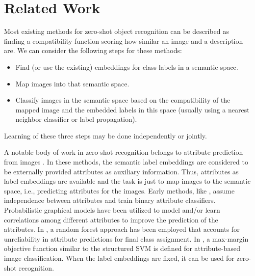 \documentclass[10pt,twocolumn,letterpaper]{article}
\begin{document}
\section{Related Work} \label{related}
Most existing methods for zero-shot object recognition can be described as finding a compatibility function scoring how
similar an image and a description are.
We can consider the following steps for these methods:
\begin{itemize}
  \item Find (or use the existing) embeddings for class labels in a semantic space.
  \item Map images into that semantic space.
  \item Classify images in the semantic space based on the compatibility of the mapped image and the embedded labels in this space (usually using a nearest neighbor classifier or label propagation).
\end{itemize}
Learning of these three steps may be done independently or jointly.

A notable body of work in zero-shot recognition belongs to attribute prediction from images \cite{lampert09, topicmodel, ajoint11, unified13, suzuki14}.
In these methods, the semantic label embeddings are considered to be externally provided attributes as auxiliary information. Thus, attributes as label embeddings are available and the task is just to map images to the semantic space, i.e., predicting attributes for the images.
Early methods, like \cite{lampert09}, assume independence between attributes and train binary attribute classifiers.
Probabilistic graphical models have been utilized to model and/or learn correlations among different attributes \cite{topicmodel, unified13} to improve the prediction of the attributes.
In \cite{jayaraman14}, a random forest approach has been employed that accounts for unreliability in attribute predictions for final class assignment.
In \cite{Akata2015pami}, a max-margin objective function similar to the structured SVM is defined for attribute-based image classification. When the label embeddings are fixed, it can be used for zero-shot recognition.

\end{document}
